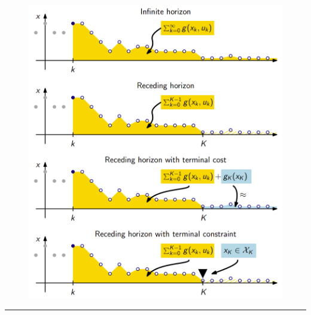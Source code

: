 \begin{minipage}{0.38\textwidth}
    \begin{figure}[H]
        \centering
        \includegraphics[width=0.9\columnwidth]{images/mpc.png}
    \end{figure}
\end{minipage}

\hrule

